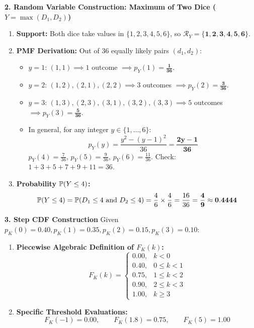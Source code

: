 \textbf{2. Random Variable Construction: Maximum of Two Dice ($Y = \max(D_1, D_2)$)}
\begin{enumerate}
    \item \textbf{Support:} Both dice take values in $\{1, 2, 3, 4, 5, 6\}$, so $\mathcal{R}_Y = \mathbf{\{1, 2, 3, 4, 5, 6\}}$.
    \item \textbf{PMF Derivation:} Out of $36$ equally likely pairs $(d_1, d_2)$:
    \begin{itemize}
        \item $y = 1$: $(1, 1) \implies 1$ outcome $\implies p_Y(1) = \mathbf{\frac{1}{36}}$.
        \item $y = 2$: $(1, 2), (2, 1), (2, 2) \implies 3$ outcomes $\implies p_Y(2) = \mathbf{\frac{3}{36}}$.
        \item $y = 3$: $(1, 3), (2, 3), (3, 1), (3, 2), (3, 3) \implies 5$ outcomes $\implies p_Y(3) = \mathbf{\frac{5}{36}}$.
        \item In general, for any integer $y \in \{1, \dots, 6\}$:
        $$p_Y(y) = \frac{y^2 - (y - 1)^2}{36} = \mathbf{\frac{2y - 1}{36}}$$
        $p_Y(4) = \frac{7}{36}$, $p_Y(5) = \frac{9}{36}$, $p_Y(6) = \frac{11}{36}$. Check: $1+3+5+7+9+11 = 36$.
    \end{itemize}
    \item \textbf{Probability $\P(Y \le 4)$:}
    $$\P(Y \le 4) = \P(D_1 \le 4 \text{ and } D_2 \le 4) = \frac{4}{6} \times \frac{4}{6} = \frac{16}{36} = \mathbf{\frac{4}{9} \approx 0.4444}$$
\end{enumerate}

\textbf{3. Step CDF Construction}
Given $p_K(0) = 0.40, p_K(1) = 0.35, p_K(2) = 0.15, p_K(3) = 0.10$:
\begin{enumerate}
    \item \textbf{Piecewise Algebraic Definition of $F_K(k)$:}
    $$F_K(k) = \begin{cases}
    0.00, & k < 0 \\
    0.40, & 0 \le k < 1 \\
    0.75, & 1 \le k < 2 \\
    0.90, & 2 \le k < 3 \\
    1.00, & k \ge 3
    \end{cases}$$
    \item \textbf{Specific Threshold Evaluations:}
    $$F_K(-1) = \mathbf{0.00}, \qquad F_K(1.8) = \mathbf{0.75}, \qquad F_K(5) = \mathbf{1.00}$$
\end{enumerate}

